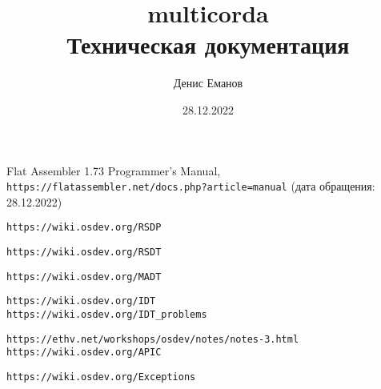 \documentclass{book}
\title{multicorda\\Техническая документация}
\author{Денис Еманов}
\date{28.12.2022}
\begin{document}
\maketitle

\tableofcontents



\mainmatter









\backmatter

\begin{thebibliography}{9}

  Flat Assembler 1.73 Programmer's Manual,\\
  \verb|https://flatassembler.net/docs.php?article=manual|
  (дата обращения: 28.12.2022)

  \verb|https://wiki.osdev.org/RSDP|

  \verb|https://wiki.osdev.org/RSDT|

  \verb|https://wiki.osdev.org/MADT|

  \verb|https://wiki.osdev.org/IDT|\\
  \verb|https://wiki.osdev.org/IDT_problems|

  \verb|https://ethv.net/workshops/osdev/notes/notes-3.html|\\
  \verb|https://wiki.osdev.org/APIC|

  \verb|https://wiki.osdev.org/Exceptions|

\end{thebibliography}
\end{document}
